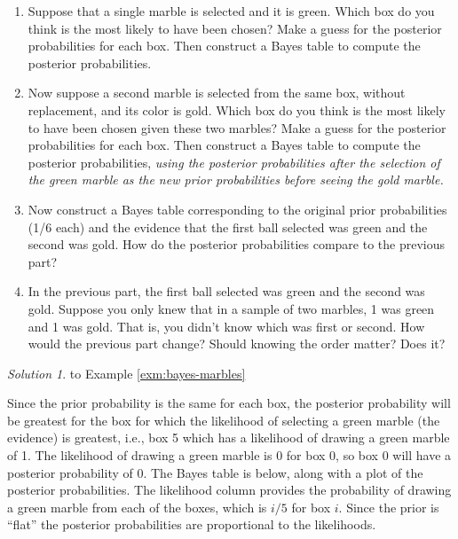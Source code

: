 \documentclass[
]{book}
\providecommand{\tightlist}{%
  \setlength{\itemsep}{0pt}\setlength{\parskip}{0pt}}
\theoremstyle{definition}
\theoremstyle{definition}
\theoremstyle{definition}
\theoremstyle{remark}
\newtheorem*{solution}{Solution}
\begin{document}
\begin{enumerate}
\def\labelenumi{\arabic{enumi}.}
\tightlist
\item
  Suppose that a single marble is selected and it is green. Which box do you think is the most likely to have been chosen? Make a guess for the posterior probabilities for each box. Then construct a Bayes table to compute the posterior probabilities.\\
\item
  Now suppose a second marble is selected from the same box, without replacement, and its color is gold. Which box do you think is the most likely to have been chosen given these two marbles? Make a guess for the posterior probabilities for each box. Then construct a Bayes table to compute the posterior probabilities, \emph{using the posterior probabilities after the selection of the green marble as the new prior probabilities before seeing the gold marble.}
\item
  Now construct a Bayes table corresponding to the original prior probabilities (1/6 each) and the evidence that the first ball selected was green and the second was gold. How do the posterior probabilities compare to the previous part?
\item
  In the previous part, the first ball selected was green and the second was gold. Suppose you only knew that in a sample of two marbles, 1 was green and 1 was gold. That is, you didn't know which was first or second. How would the previous part change? Should knowing the order matter? Does it?
\end{enumerate}

\begin{solution}
{}to Example \ref{exm:bayes-marbles}
\end{solution}

Since the prior probability is the same for each box, the posterior probability will be greatest for the box for which the likelihood of selecting a green marble (the evidence) is greatest, i.e., box 5 which has a likelihood of drawing a green marble of 1.
The likelihood of drawing a green marble is 0 for box 0, so box 0 will have a posterior probability of 0.
The Bayes table is below, along with a plot of the posterior probabilities.
The likelihood column provides the probability of drawing a green marble from each of the boxes, which is \(i/5\) for box \(i\). Since the prior is ``flat'' the posterior probabilities are proportional to the likelihoods.
\end{document}
